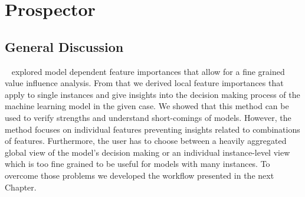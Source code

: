 \chapter{Prospector}
\label{chap:prospector}


\section{General Discussion}
\prospector~\cite{prospector16} explored model dependent feature importances that allow for a fine grained value influence analysis.
From that we derived local feature importances that apply to single instances and give insights into the decision making process of the machine learning model in the given case.
We showed that this method can be used to verify strengths and understand short-comings of models.
However, the method focuses on individual features preventing insights related to combinations of features.
Furthermore, the user has to choose between a heavily aggregated global view of the model's decision making or an individual instance-level view which is too fine grained to be useful for models with many instances.
To overcome those problems we developed the workflow presented in the next Chapter.


% 


